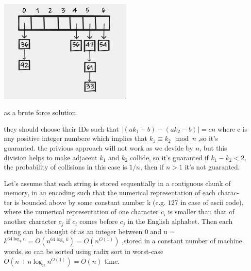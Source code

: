 \documentclass[12pt,twoside]{article}
\begin{document}


\begin{problems}

\problem  %

\begin{problemparts}
\problempart %
 \includegraphics[width=0.5\textwidth]{img1.png}

 as a brute force solution.
\end{problemparts}

\newpage

\problem  %

\begin{problemparts}
\problempart %
  they should choose their IDs such that $|(ak_1 + b) - (ak_2 - b)| = cn$ where c is any positive integer numbere 
  which implies that $k_1 \equiv k_2 \mod n$ ,so it's guaranted.
\problempart %
the privious approach will not work as we devide by $n$, but this division helps to make adjacent $k_1$ and $k_2$
collide, so it's guaranted if $k_1 - k_2 < 2$.
\problempart %
  the probability of collisions in this case is $1/n$, then if $n > 1$ it's not guaranted.
\end{problemparts}

\newpage

\problem  %

\begin{problemparts}
\problempart %
Let’s assume that each string is stored sequentially in a contiguous chunk 
of memory, in an encoding such that the numerical representation of each charac-
ter is bounded above by some constant number k (e.g. $127$ in case of ascii code),
 where the numerical representation of one 
character $c_i$ is smaller than that of another character $c_j$ if $c_i$ comes before $c_j$ in the 
  English alphabet. Then each string can be thought of as an integer between $0$ and u = $k^{64\log_4{n}} 
  = O(n^{64\log_4{k}}) = O(n^{O(1)})$ ,stored in a constant number of machine words, so 
  can be sorted using radix sort in worst-case $O(n + n \log_n{n^{O(1)}}) = O(n)$ time.


\end{problemparts}
\end{problems}
\end{document}
